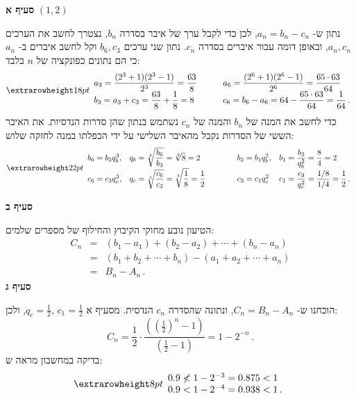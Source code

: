 \textbf{סעיף א}
$(1,2)$

נתון ש-%
$a_n=b_n-c_n$,
לכן כדי לקבל ערך של איבר בסדרה
$b_n$,
נצטרך לחשב את הערכים
$a_n,c_n$,
ובאופן דומה עבור איברים בסדרה
$c_n$.
נתון שני ערכים
$b_6,c_3$
וקל לחשב איברים ב-%
$a_n$
כי הם נתונים כפונקציה של 
$n$ 
בלבד:
\[
\erh{18pt}
\begin{array}{l@{\hspace{3em}}l}
\displaystyle a_3=\frac{(2^3+1)(2^3-1)}{2^3}=\frac{63}{8}&\displaystyle a_6=\frac{(2^6+1)(2^6-1)}{2^6}= \frac{65\cdot 63}{64}\\
\displaystyle b_3=a_3+c_3=\frac{63}{8}+\frac{1}{8}=8 &\displaystyle  c_6=b_6-a_6=64-\frac{65\cdot 63}{64}=\frac{1}{64}\,.
\end{array}
\]
כדי לחשב את המנה של
$b_n$
והמנה של
$c_n$
נשתמש בנתון שהן סדרות הנדסיות. את האיבר הששי של הסדרות נקבל מהאיבר השלישי על ידי הכפלתו במנה לחזקה שלוש:
\vspace{-1ex}
\[
\erh{22pt}
\begin{array}{l@{\hspace{1em}}l@{\hspace{4em}}l@{\hspace{1em}}l}
b_6=b_3q_b^3, &
\displaystyle q_b=\sqrt[3]{\frac{b_6}{b_3}}=\sqrt[3]{8}=2&
b_3=b_1 q_b^2, &
\displaystyle b_1=\frac{b_3}{q_b^2}=\frac{8}{4}=2\\
c_6=c_3q_c^3, &
\displaystyle q_c=\sqrt[3]{\frac{c_6}{c_3}} =\sqrt[3]{\frac{1}{8}} = \frac{1}{2}&
c_3=c_1 q_c^2 &
\displaystyle c_1=\frac{c_3}{q_c^2}=\frac{1/8}{1/4}=\frac{1}{2}\,.
\end{array}
\]

\np

\textbf{סעיף ב}

הטיעון נובע מחוקי הקיבוץ והחילוף של מספרים שלמים:
\begin{eqnarray*}
C_n &=& (b_1-a_1) + (b_2 - a_2) + \cdots + (b_n-a_n)\\
&=&(b_1 + b_2 + \cdots + b_n) - (a_1 + a_2 + \cdots + a_n)\\
&=& B_n - A_n\,.
\end{eqnarray*}
\textbf{סעיף ג}

הוכחנו ש-%
$C_n=B_n-A_n$,
ונתונה שהסדרה 
$c_n$
הנדסית. מסעיף א
$\displaystyle q_c=\frac{1}{2},\,c_1=\frac{1}{2}$,
ולכן:
\[
C_n = \frac{1}{2}\cdot\frac{\displaystyle\left(\left(\frac{1}{2}\right)^n-1\right)}{\displaystyle\left(\frac{1}{2}-1\right)}=1-2^{-n}\,.
\]
בדיקה במחשבון מראה ש:
\[
\erh{8pt}
\begin{array}{l}
0.9 \not< 1-2^{-3}=0.875<1\\
0.9 < 1-2^{-4}=0.938 < 1\,.
\end{array}
\]

